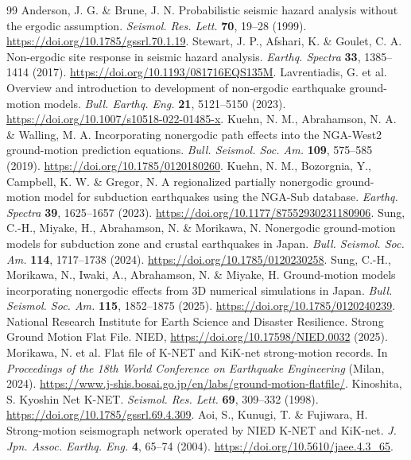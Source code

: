 \begin{thebibliography}{99}
 Anderson, J. G. \& Brune, J. N. Probabilistic seismic hazard analysis without the ergodic assumption. \textit{Seismol. Res. Lett.} \textbf{70}, 19--28 (1999). \url{https://doi.org/10.1785/gssrl.70.1.19}.
 Stewart, J. P., Afshari, K. \& Goulet, C. A. Non-ergodic site response in seismic hazard analysis. \textit{Earthq. Spectra} \textbf{33}, 1385--1414 (2017). \url{https://doi.org/10.1193/081716EQS135M}.
 Lavrentiadis, G. et al. Overview and introduction to development of non-ergodic earthquake ground-motion models. \textit{Bull. Earthq. Eng.} \textbf{21}, 5121--5150 (2023). \url{https://doi.org/10.1007/s10518-022-01485-x}.
 Kuehn, N. M., Abrahamson, N. A. \& Walling, M. A. Incorporating nonergodic path effects into the NGA-West2 ground-motion prediction equations. \textit{Bull. Seismol. Soc. Am.} \textbf{109}, 575--585 (2019). \url{https://doi.org/10.1785/0120180260}.
 Kuehn, N. M., Bozorgnia, Y., Campbell, K. W. \& Gregor, N. A regionalized partially nonergodic ground-motion model for subduction earthquakes using the NGA-Sub database. \textit{Earthq. Spectra} \textbf{39}, 1625--1657 (2023). \url{https://doi.org/10.1177/87552930231180906}.
 Sung, C.-H., Miyake, H., Abrahamson, N. \& Morikawa, N. Nonergodic ground-motion models for subduction zone and crustal earthquakes in Japan. \textit{Bull. Seismol. Soc. Am.} \textbf{114}, 1717--1738 (2024). \url{https://doi.org/10.1785/0120230258}.
 Sung, C.-H., Morikawa, N., Iwaki, A., Abrahamson, N. \& Miyake, H. Ground-motion models incorporating nonergodic effects from 3D numerical simulations in Japan. \textit{Bull. Seismol. Soc. Am.} \textbf{115}, 1852--1875 (2025). \url{https://doi.org/10.1785/0120240239}.
 National Research Institute for Earth Science and Disaster Resilience. Strong Ground Motion Flat File. NIED, \url{https://doi.org/10.17598/NIED.0032} (2025).
 Morikawa, N. et al. Flat file of K-NET and KiK-net strong-motion records. In \textit{Proceedings of the 18th World Conference on Earthquake Engineering} (Milan, 2024). \url{https://www.j-shis.bosai.go.jp/en/labs/ground-motion-flatfile/}.
 Kinoshita, S. Kyoshin Net K-NET. \textit{Seismol. Res. Lett.} \textbf{69}, 309--332 (1998). \url{https://doi.org/10.1785/gssrl.69.4.309}.
 Aoi, S., Kunugi, T. \& Fujiwara, H. Strong-motion seismograph network operated by NIED K-NET and KiK-net. \textit{J. Jpn. Assoc. Earthq. Eng.} \textbf{4}, 65--74 (2004). \url{https://doi.org/10.5610/jaee.4.3_65}.

\end{thebibliography}
